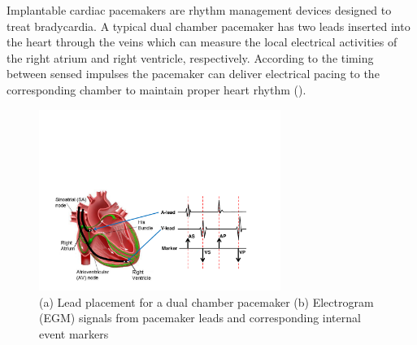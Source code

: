 Implantable cardiac pacemakers are rhythm management devices designed to treat bradycardia. 
A typical dual chamber pacemaker has two leads inserted into the heart through the veins which can measure the local electrical activities of the right atrium and right ventricle, respectively. According to the timing between sensed impulses the pacemaker can deliver electrical pacing to the corresponding chamber to maintain proper heart rhythm ().  
\begin{figure}[!t]
	\centering
	\includegraphics[width=0.7\textwidth]{figs/egm.pdf}
	
	\caption{\small (a) Lead placement for a dual chamber pacemaker (b) Electrogram (EGM) signals from pacemaker leads and corresponding internal event markers}
	\label{fig:probes}
\end{figure} 



